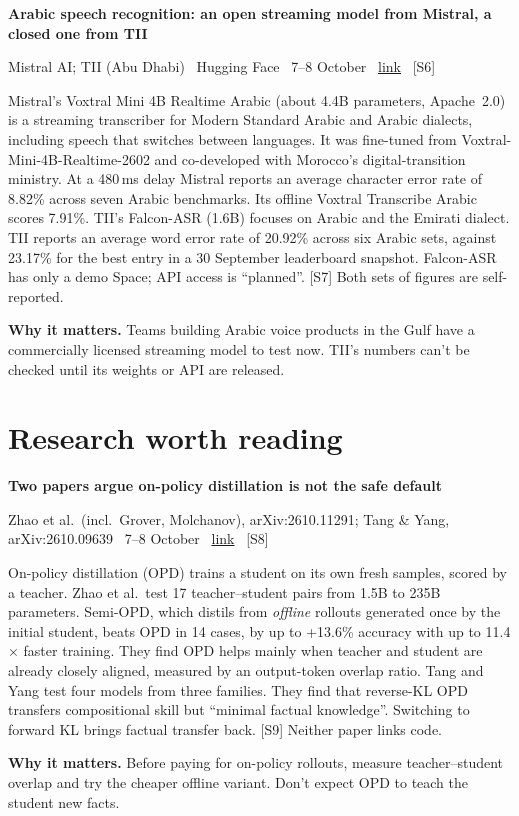 \documentclass[11pt,a4paper]{article}
\newcommand{\entry}[4]{%
  \par\vspace{0.7em}%
  {\sffamily\bfseries\color{brandink}#1}\par
  {\footnotesize\color{brandgrey}#2 \textbullet\ \href{#3}{link} \textbullet\ \srcref{#4}}\par
  \vspace{0.15em}}
\newcommand{\why}[1]{\par{\small\textbf{Why it matters.} #1}\par}
\newcommand{\srcref}[1]{\textcolor{brandaccent}{[S#1]}}
\begin{document}
\entry{Arabic speech recognition: an open streaming model from Mistral, a closed one from TII}{Mistral AI; TII (Abu Dhabi) \textbullet\ Hugging Face \textbullet\ 7--8 October}{https://huggingface.co/mistralai/Voxtral-Mini-4B-Realtime-Arabic}{6}
Mistral's Voxtral Mini 4B Realtime Arabic (about 4.4B parameters, Apache~2.0) is a streaming
transcriber for Modern Standard Arabic and Arabic dialects, including speech that switches between languages. It was fine-tuned from
Voxtral-Mini-4B-Realtime-2602 and co-developed with Morocco's digital-transition ministry. At a 480\,ms delay
Mistral reports an average character error rate of 8.82\% across seven Arabic benchmarks. Its
offline Voxtral Transcribe Arabic scores 7.91\%. TII's Falcon-ASR (1.6B) focuses on Arabic
and the Emirati dialect. TII reports an average word error rate of 20.92\% across six Arabic sets, against
23.17\% for the best entry in a 30 September leaderboard snapshot. Falcon-ASR has only a demo Space; API
access is ``planned''. \srcref{7} Both sets of figures are self-reported.
\why{Teams building Arabic voice products in the Gulf have a commercially licensed streaming model to test now. TII's numbers can't be checked until its weights or API are released.}

\section{Research worth reading}

\entry{Two papers argue on-policy distillation is not the safe default}{Zhao et al.\ (incl.\ Grover, Molchanov), arXiv:2610.11291; Tang \& Yang, arXiv:2610.09639 \textbullet\ 7--8 October}{https://arxiv.org/abs/2610.11291}{8}
On-policy distillation (OPD) trains a student on its own fresh samples, scored by a teacher.
Zhao et al.\ test 17 teacher--student pairs from 1.5B to 235B parameters. Semi-OPD, which distils from
\emph{offline} rollouts generated once by the initial student, beats OPD in 14 cases, by up to +13.6\% accuracy with up to
11.4$\times$ faster training. They find OPD helps mainly when teacher and student are already closely aligned, measured by
an output-token overlap ratio. Tang and Yang test four models from three families. They find that
reverse-KL OPD transfers compositional skill but ``minimal factual knowledge''. Switching to forward
KL brings factual transfer back. \srcref{9} Neither paper links code.
\why{Before paying for on-policy rollouts, measure teacher--student overlap and try the cheaper offline variant. Don't expect OPD to teach the student new facts.}
\end{document}

